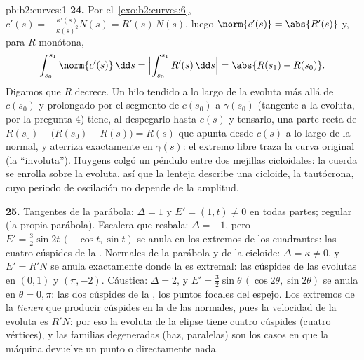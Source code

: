\begin{solution}{pb:b2:curves:1}
\textbf{24.} Por el~\cref{exo:b2:curves:6}, $c'(s) =
-\frac{\kappa'(s)}{\kappa(s)^2}N(s) = R'(s)\,N(s)$, luego
$\norm{c'(s)} = \abs{R'(s)}$ y, para $R$ monótona,
\[
\int_{s_0}^{s_1}\norm{c'(s)}\,\dd s =
\Bigl|\int_{s_0}^{s_1}R'(s)\,\dd s\Bigr| = \abs{R(s_1) -
R(s_0)} .
\]
Digamos que $R$ decrece. Un hilo tendido a lo largo de la evoluta más
allá de $c(s_0)$ y prolongado por el segmento de $c(s_0)$ a
$\gamma(s_0)$ (tangente a la evoluta, por la pregunta 4) tiene, al
despegarlo hasta $c(s)$ y tensarlo, una parte recta de 
$R(s_0) - \bigl(R(s_0) - R(s)\bigr) = R(s)$ que apunta desde $c(s)$ a
lo largo de la normal, y aterriza exactamente en $\gamma(s)$: el
extremo libre traza la curva original (la ``involuta''). Huygens
colgó un péndulo entre dos mejillas cicloidales: la cuerda se enrolla
sobre la evoluta, así que la lenteja describe una cicloide, la
tautócrona, cuyo periodo de oscilación no depende de la amplitud.

\textbf{25.} Tangentes de la parábola: $\Delta = 1$ y $E' = (1, t)
\neq 0$ en todas partes;  regular (la propia parábola).
Escalera que resbala: $\Delta = -1$, pero $E' = \tfrac32\sin 2t\,
(-\cos t, \sin t)$ se anula en los extremos de los cuadrantes: las
cuatro cúspides de la . Normales de la parábola y de la
cicloide: $\Delta = \kappa \neq 0$, y $E' = R'N$ se anula exactamente
donde la  es extremal: las cúspides de las evolutas en
$(0,1)$ y $(\pi, -2)$. Cáustica: $\Delta = 2$, y $E' =
\tfrac32\sin\theta\,(\cos2\theta, \sin2\theta)$ se anula en $\theta =
0, \pi$: las dos cúspides de la , los puntos focales del
espejo. Los extremos de la  \emph{tienen} que producir
cúspides en la  de las normales, pues la velocidad de la
evoluta es $R'N$: por eso la evoluta de la elipse tiene cuatro
cúspides (cuatro vértices), y las familias degeneradas (haz,
paralelas) son los casos en que la máquina devuelve un punto o
directamente nada.
\end{solution}
